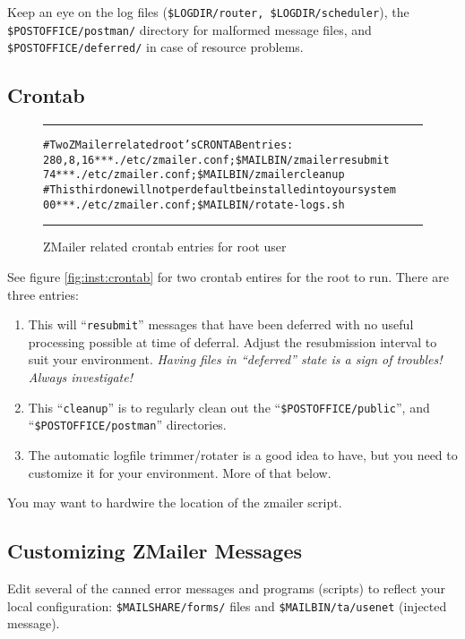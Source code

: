 Keep an eye on the log files ({\tt \$LOGDIR/router, \$LOGDIR/scheduler}),
the {\tt \$POSTOFFICE/postman/} directory for malformed message files,
and {\tt \$POSTOFFICE/deferred/} in case of resource problems.

\subsection{Crontab}

\begin{figure*}
\begin{alltt}\hrule\medskip
# Two ZMailer related root's CRONTAB entries:
28 0,8,16 * * * . /etc/zmailer.conf ; \$MAILBIN/zmailer resubmit
7  4      * * * . /etc/zmailer.conf ; \$MAILBIN/zmailer cleanup
# {\rm This third one will not per default be installed into your system}
0  0      * * * . /etc/zmailer.conf ; \$MAILBIN/rotate-logs.sh
\medskip\hrule\end{alltt}\medskip
\caption{\label{fig:inst:crontab}ZMailer related crontab entries for root user}
\end{figure*}

See figure \vref{fig:inst:crontab} for two crontab entires for
the root to run.  There are three entries:
\begin{enumerate}
\item
This will ``{\tt resubmit}'' messages that have been deferred with
no useful processing possible at time of deferral.  Adjust the
resubmission interval to suit your environment.
{\em Having files in ``deferred'' state is a sign of troubles!
Always investigate!}

\item
This ``{\tt cleanup}'' is to regularly clean out
the ``{\tt \$POSTOFFICE/public}'', and ``{\tt \$POSTOFFICE/postman}''
directories.

\item
The automatic logfile trimmer/rotater is a good idea to have, but
you need to customize it for your environment.  More of that below.
\end{enumerate}

You may want to hardwire the location of the zmailer script.


\subsection{Customizing ZMailer Messages}

Edit several of the canned error messages and programs (scripts)
to reflect your local configuration: {\tt \$MAILSHARE/forms/} files and
{\tt \$MAILBIN/ta/usenet} (injected message).

